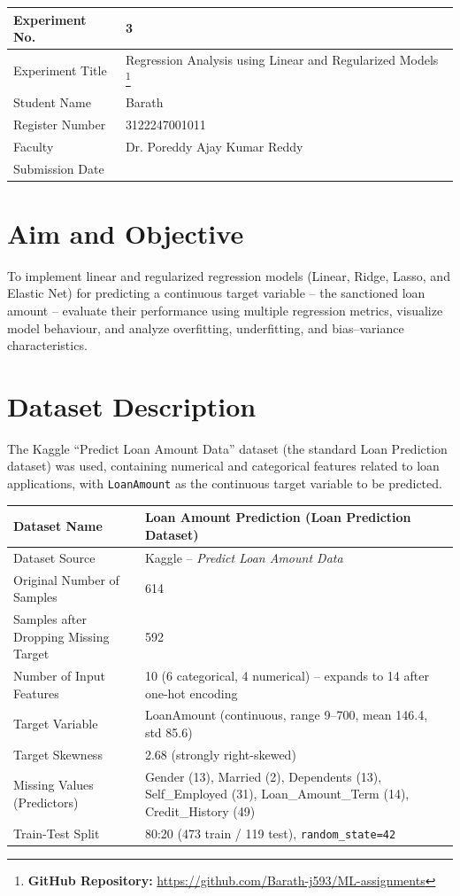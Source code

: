 \documentclass[12pt,a4paper]{article}
\begin{document}
\begin{tabular}{|p{4cm}|p{11cm}|}
\hline
Experiment No. & 3 \\ \hline
Experiment Title & Regression Analysis using Linear and Regularized Models
\footnote{\textbf{GitHub Repository: }\url{https://github.com/Barath-j593/ML-assignments}}\\ \hline
Student Name & Barath \\ \hline
Register Number & 3122247001011 \\ \hline
Faculty & Dr. Poreddy Ajay Kumar Reddy \\ \hline
Submission Date & \\ \hline
\end{tabular}

\section{Aim and Objective}
To implement linear and regularized regression models (Linear, Ridge, Lasso, and Elastic
Net) for predicting a continuous target variable -- the sanctioned loan amount -- evaluate
their performance using multiple regression metrics, visualize model behaviour, and analyze
overfitting, underfitting, and bias--variance characteristics.

\section{Dataset Description}
The Kaggle ``Predict Loan Amount Data'' dataset (the standard Loan Prediction dataset) was
used, containing numerical and categorical features related to loan applications, with
\texttt{LoanAmount} as the continuous target variable to be predicted.

\begin{longtable}{|p{6cm}|p{8cm}|}
\hline
Dataset Name & Loan Amount Prediction (Loan Prediction Dataset) \\ \hline
Dataset Source & Kaggle -- \textit{Predict Loan Amount Data} \\ \hline
Original Number of Samples & 614 \\ \hline
Samples after Dropping Missing Target & 592 \\ \hline
Number of Input Features & 10 (6 categorical, 4 numerical) -- expands to 14 after one-hot encoding \\ \hline
Target Variable & LoanAmount (continuous, range 9--700, mean 146.4, std 85.6) \\ \hline
Target Skewness & 2.68 (strongly right-skewed) \\ \hline
Missing Values (Predictors) & Gender (13), Married (2), Dependents (13), Self\_Employed (31), Loan\_Amount\_Term (14), Credit\_History (49) \\ \hline
Train-Test Split & 80:20 (473 train / 119 test), \texttt{random\_state=42} \\ \hline
\end{longtable}
\end{document}
